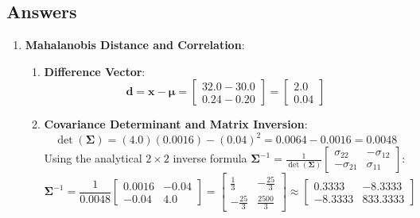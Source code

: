 \subsection*{Answers}\label{subsec:anomaly_answers}

\begin{enumerate}
    \item \textbf{Mahalanobis Distance and Correlation}:
    \begin{enumerate}[label=(\alph*)]
        \item \textbf{Difference Vector}:
        \begin{equation*}
        \mathbf{d} = \mathbf{x} - \boldsymbol{\mu} = \begin{bmatrix} 32.0 - 30.0 \\ 0.24 - 0.20 \end{bmatrix} = \begin{bmatrix} 2.0 \\ 0.04 \end{bmatrix}
        \end{equation*}

        \item \textbf{Covariance Determinant and Matrix Inversion}:
        \begin{equation*}
        \det(\mathbf{\Sigma}) = (4.0)(0.0016) - (0.04)^2 = 0.0064 - 0.0016 = \mathbf{0.0048}
        \end{equation*}
        Using the analytical $2 \times 2$ inverse formula $\mathbf{\Sigma}^{-1} = \frac{1}{\det(\mathbf{\Sigma})} \begin{bmatrix} \sigma_{22} & -\sigma_{12} \\ -\sigma_{21} & \sigma_{11} \end{bmatrix}$:
        \begin{equation*}
        \mathbf{\Sigma}^{-1} = \frac{1}{0.0048} \begin{bmatrix} 0.0016 & -0.04 \\ -0.04 & 4.0 \end{bmatrix} = \begin{bmatrix} \frac{1}{3} & -\frac{25}{3} \\ -\frac{25}{3} & \frac{2500}{3} \end{bmatrix} \approx \begin{bmatrix} 0.3333 & -8.3333 \\ -8.3333 & 833.3333 \end{bmatrix}
        \end{equation*}


\end{enumerate}
\end{enumerate}

